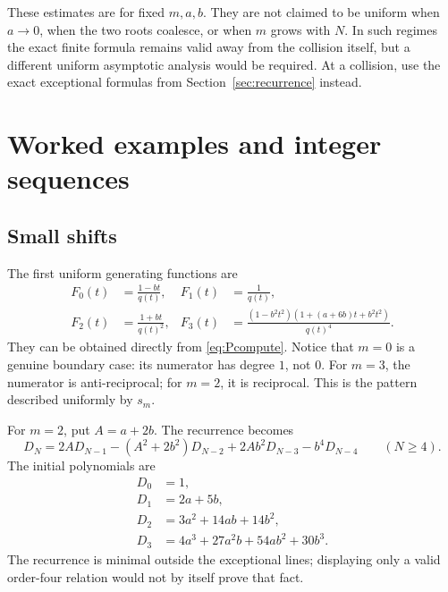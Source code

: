 \documentclass[11pt,a4paper]{article}
\numberwithin{equation}{section}
\theoremstyle{definition}
\theoremstyle{remark}
\begin{document}
These estimates are for fixed $m,a,b$.  They are not claimed to be
uniform when $a\to0$, when the two roots coalesce, or when $m$ grows
with $N$.  In such regimes the exact finite formula remains valid
away from the collision itself, but a different uniform asymptotic
analysis would be required.  At a collision, use the exact exceptional
formulas from Section~\ref{sec:recurrence} instead.

\noindent[Added 29 September 2026, batch 57: for this family with real
$a/b\ge0$, limits with $m$ growing with $N$ are treated in Part~VI.
With $v=m+\tfrac12$, $B=N+m+1$ and $\tau=(a/b)NB/(4v)$, the ratio
$D_N^{(m)}(a,b)/D_N^{(m)}(0,b)$ tends to $1$ exactly when $\tau\to0$,
for every relative growth of $N$ and $m$
(Corollary~\ref{gs:cor:invisibility}); when $N,m\to\infty$ its
logarithm is governed by $\beta=\bigl(1+c(v+\tfrac32)\bigr)/(v+1)$,
$c=v/(NB)$, with critical scales $\tau\asymp\beta^{-1/2}$,
$\beta^{-2/3}$ and $\beta^{-1}$ (Theorem~\ref{gs:thm:overview}).
Coalescing roots and $a/b<0$ are not treated there.]

\section{Worked examples and integer sequences}\label{sec:examples}

\subsection{Small shifts}
The first uniform generating functions are
\begin{align}
 F_0(t)&=\frac{1-bt}{q(t)},&
 F_1(t)&=\frac1{q(t)},\label{eq:low01}\\
 F_2(t)&=\frac{1+bt}{q(t)^2},&
 F_3(t)&=\frac{(1-b^2t^2)(1+(a+6b)t+b^2t^2)}{q(t)^4}.
 \label{eq:low23}
\end{align}
They can be obtained directly from \eqref{eq:Pcompute}.  Notice that
$m=0$ is a genuine boundary case: its numerator has degree $1$, not $0$.
For $m=3$, the numerator is anti-reciprocal; for $m=2$, it is reciprocal.
This is the pattern described uniformly by $s_m$.

For $m=2$, put $A=a+2b$.  The recurrence becomes
\begin{equation}\label{eq:m2rec}
 D_N=2A D_{N-1}-(A^2+2b^2)D_{N-2}
         +2Ab^2D_{N-3}-b^4D_{N-4}\qquad(N\geq4).
\end{equation}
The initial polynomials are
\begin{align*}
 D_0&=1,\\
 D_1&=2a+5b,\\
 D_2&=3a^2+14ab+14b^2,\\
 D_3&=4a^3+27a^2b+54ab^2+30b^3.
\end{align*}
The recurrence is minimal outside the exceptional lines; displaying
only a valid order-four relation would not by itself prove that fact.
\end{document}
